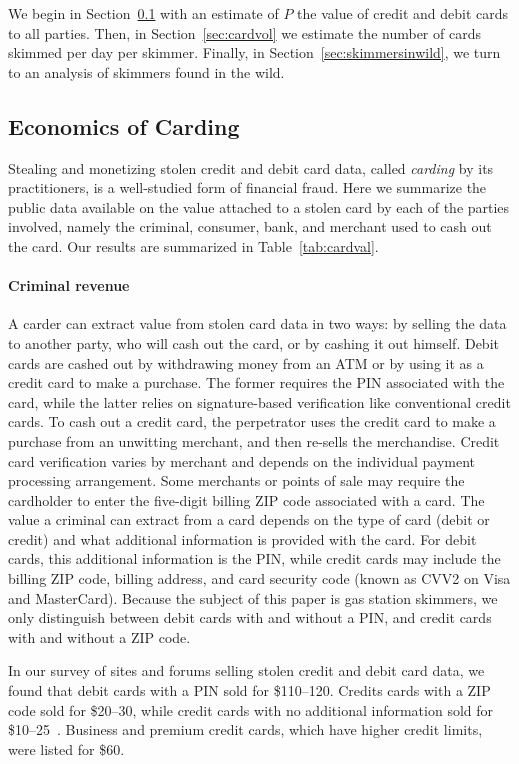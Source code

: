 We begin in Section~\ref{subsec:cardval} with an estimate of $P$ the value of credit and debit cards to all parties. Then,
in Section~\ref{sec:cardvol} we estimate the number of cards skimmed per day per skimmer. Finally, in
Section~\ref{sec:skimmersinwild}, we turn to an analysis of skimmers found in the wild.

\subsection{Economics of Carding}\label{subsec:cardval}

Stealing and monetizing stolen credit and debit card data, called \emph{carding} by its practitioners, is a well-studied
form of financial fraud. Here we summarize the public data available on the value attached to a stolen card by each of the
parties involved, namely the criminal, consumer, bank, and merchant used to cash out the card. Our results are summarized
in Table~\ref{tab:cardval}.

\paragraph{Criminal revenue} A carder can extract value from stolen card data in two ways: by selling the data to another
party, who will cash out the card, or by cashing it out himself. Debit cards are cashed out by withdrawing money from an
ATM or by using it as a credit card to make a purchase. The former requires the PIN associated with the card, while the
latter relies on signature-based verification like conventional credit cards. To cash out a credit card, the perpetrator
uses the credit card to make a purchase from an unwitting merchant, and then re-sells the merchandise. Credit card verification
varies by merchant and depends on the individual payment processing arrangement. Some merchants or points of sale may require
the cardholder to enter the five-digit billing ZIP code associated with a card. The value a criminal can extract from a
card depends on the type of card (debit or credit) and what additional information is provided with the card. For debit
cards, this additional information is the PIN, while credit cards may include the billing ZIP code, billing address, and
card security code (known as CVV2 on Visa and MasterCard). Because the subject of this paper is gas station skimmers, we
only distinguish between debit cards with and without a PIN, and credit cards with and without a ZIP code.

In our survey of sites and forums selling stolen credit and debit card data, we found that debit cards with a PIN sold for
\$110--120. Credits cards with a ZIP code sold for \$20--30, while credit cards with no additional information sold for
\$10--25~\cite{meccadumps,legitshop, sellcvv,dumpsto, dumpsPrtShip}. Business and premium credit cards, which
have higher credit limits, were listed for \$60.

